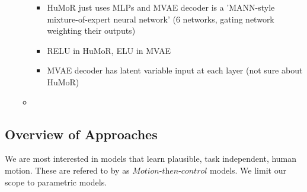 \begin{itemize}
\begin{itemize}
        \begin{itemize}
            \item HuMoR just uses MLPs and MVAE decoder is a 'MANN-style mixture-of-expert neural network' (6 networks, gating network weighting their outputs)
            \item RELU in HuMoR, ELU in MVAE
            \item MVAE decoder has latent variable input at each layer (not sure about HuMoR)
        \end{itemize}
        \item 
    \end{itemize}
\end{itemize}


\subsection{Overview of Approaches}
We are most interested in models that learn plausible, task independent, human motion. These are refered to by \cite{MVAE} as $\textit{Motion-then-control}$ models. We limit our scope to parametric models.

